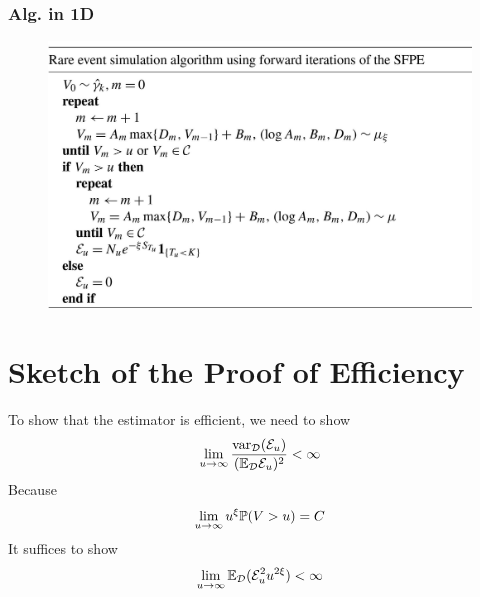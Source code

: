 \documentclass{beamer}
\begin{document}
\begin{frame}
  \frametitle{Alg. in 1D}
  \begin{figure}[htb!]
    \centering
    \includegraphics[scale=0.14]{IMG_1091.jpg}
  \end{figure}
\end{frame}





\section{Sketch of the Proof of Efficiency}
\begin{frame}
  To show that the estimator is efficient, we need to show
  \[
  \lim_{u \to \infty} {
    \var_{\mathcal D}(\mathcal E_u)
    \over
    (\E_{\mathcal D} \mathcal E_u)^2
  } < \infty
  \]
  Because
  \[
  \lim_{u \to \infty} u^\xi \P(V > u) = C
  \]
  It suffices to show
  \[
  \lim_{u \to \infty}
    \E_{\mathcal D}(\mathcal E_u^2 u^{2\xi}) < \infty
  \]
\end{frame}
\end{document}
